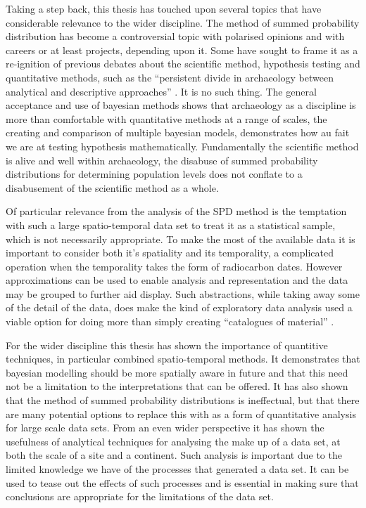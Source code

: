 Taking a step back, this thesis has touched upon several topics that have considerable relevance to the wider discipline. The method of summed probability distribution has become a controversial topic with polarised opinions and with careers or at least projects, depending upon it. Some have sought to frame it as a re-ignition of previous debates about the scientific method, hypothesis testing  and quantitative methods, such as the ``persistent divide in archaeology between analytical and descriptive approaches'' \citep[200]{Timpson2015199}. It is no such thing. The general acceptance and use of bayesian methods shows that archaeology as a discipline is more than comfortable with quantitative methods at a range of scales, the creating and comparison of multiple bayesian models, demonstrates how au fait we are at testing hypothesis mathematically. Fundamentally the scientific method is alive and well within archaeology, the disabuse of summed probability distributions for determining population levels does not conflate to a disabusement of the scientific method as a whole. 

Of particular relevance from the analysis of the SPD method is the temptation with such a large spatio-temporal data set to treat it as a statistical sample, which is not necessarily appropriate. To make the most of the available data it is important to consider both it's spatiality and its temporality, a complicated operation when the temporality takes the form of radiocarbon dates. However approximations can be used to enable analysis and representation and the data may be grouped to further aid display. Such abstractions, while taking away some of the detail of the data, does make the kind of exploratory data analysis used a viable option for doing more than simply creating ``catalogues of material'' \citep[200]{Timpson2015199}. 

For the wider discipline this thesis has shown the importance of quantitive techniques, in particular combined spatio-temporal methods. It demonstrates that bayesian modelling should be more spatially aware in future and that this need not be a limitation to the interpretations that can be offered. It has also shown that the method of summed probability distributions is ineffectual, but that there are many potential options to replace this with as a form of quantitative analysis for large scale data sets. From an even wider perspective it has shown the usefulness of analytical techniques for analysing the make up of a data set, at both the scale of a site and a continent. Such analysis is important due to the limited knowledge we have of the processes that generated a data set. It can be used to tease out the effects of such processes and is essential in making sure that conclusions are appropriate for the limitations of the data set.

